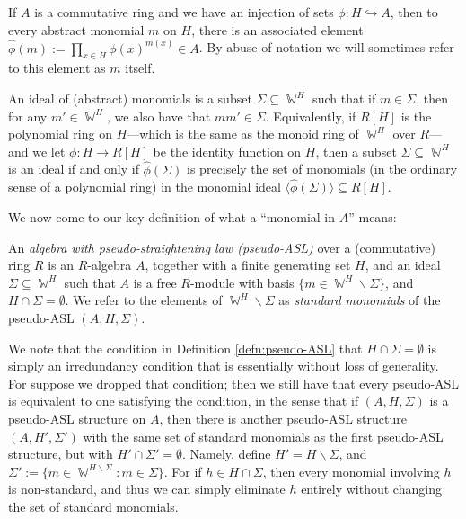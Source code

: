 \documentclass[11pt,reqno]{amsart}
\DeclareMathOperator{\W}{\mathbb{W}}
\theoremstyle{definition}
\numberwithin{equation}{section}
\begin{document}
If $A$ is a commutative ring and we have an injection of sets $\phi: H \hookrightarrow A$, then to every abstract monomial $m$ on $H$, there is an associated element $\hat{\phi}(m) := \prod_{x \in H} \phi(x)^{m(x)} \in A$. By abuse of notation we will sometimes refer to this element as $m$ itself. 

An ideal of (abstract) monomials is a subset $\Sigma \subseteq \W^{H}$ such that if $m \in \Sigma$, then for any $m' \in \W^{H}$, we also have that $mm' \in \Sigma$. Equivalently, if $R[H]$ is the polynomial ring on $H$---which is the same as the monoid ring of $\W^H$ over $R$---and we let $\phi \colon H \to R[H]$ be the identity function on $H$, then a subset $\Sigma \subseteq \W^H$ is an ideal if and only if $\hat{\phi}(\Sigma)$ is precisely the set of monomials (in the ordinary sense of a polynomial ring) in the monomial ideal $\langle \hat{\phi}(\Sigma) \rangle \subseteq R[H]$.

We now come to our key definition of what a ``monomial in $A$'' means:

\begin{definition}
\label{defn:pseudo-ASL}
An \emph{algebra with pseudo-straightening law (pseudo-ASL)} over a (commutative) ring $R$ is an $R$-algebra $A$, together with a finite generating set $H$, and an ideal $\Sigma \subseteq \W^H$ such that $A$ is a free $R$-module with basis $\{m \in \W^H \backslash \Sigma\}$, and $H \cap \Sigma = \emptyset$. We refer to the elements of $\W^H \backslash \Sigma$ as \emph{standard monomials} of the pseudo-ASL $(A,H,\Sigma)$.
\end{definition}

\begin{remark}
We note that the condition in Definition \ref{defn:pseudo-ASL} that $H \cap \Sigma = \emptyset$ is simply an irredundancy condition that is essentially without loss of generality. For suppose we dropped that condition; then we still have that every pseudo-ASL is equivalent to one satisfying the condition, in the sense that if $(A, H, \Sigma)$ is a pseudo-ASL structure on $A$, then there is another pseudo-ASL structure $(A, H', \Sigma')$ with the same set of standard monomials as the first pseudo-ASL structure, but with $H' \cap \Sigma' = \emptyset$. Namely, define $H' = H \backslash \Sigma$, and $\Sigma' := \{m \in \W^{H \backslash \Sigma} : m \in \Sigma\}$. For if $h \in H \cap \Sigma$, then every monomial involving $h$ is non-standard, and thus we can simply eliminate $h$ entirely without changing the set of standard monomials.
\end{remark}
\end{document}
